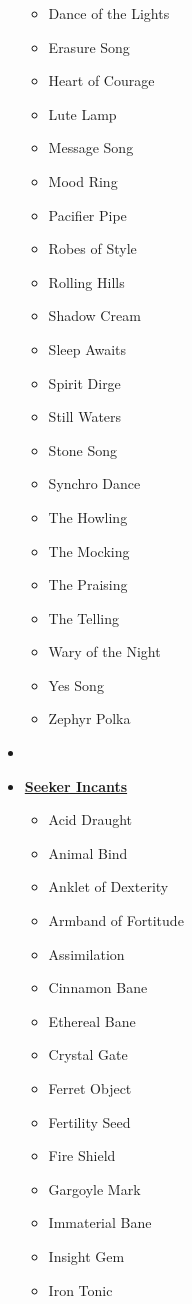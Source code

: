 \begin{multicols*}{4}
\begin{itemize}[leftmargin=0pt]
\begin{itemize}[leftmargin=0pt]
		\item[] Dance of the Lights
		\item[] Erasure Song
		\item[] Heart of Courage
		\item[] Lute Lamp
		\item[] Message Song
		\item[] Mood Ring
		\item[] Pacifier Pipe
		\item[] Robes of Style
		\item[] Rolling Hills
		\item[] Shadow Cream
		\item[] Sleep Awaits
		\item[] Spirit Dirge
		\item[] Still Waters
		\item[] Stone Song
		\item[] Synchro Dance
		\item[] The Howling
		\item[] The Mocking
		\item[] The Praising
		\item[] The Telling
		\item[] Wary of the Night
		\item[] Yes Song
		\item[] Zephyr Polka
	\end{itemize}
	\item[] 
	\item[] \textbf{\ul{Seeker Incants}}
	\begin{itemize}[leftmargin=0pt]
		\item[] Acid Draught
		\item[] Animal Bind
		\item[] Anklet of Dexterity
		\item[] Armband of Fortitude
		\item[] Assimilation
		\item[] Cinnamon Bane
		\item[] Ethereal Bane
		\item[] Crystal Gate
		\item[] Ferret Object
		\item[] Fertility Seed
		\item[] Fire Shield
		\item[] Gargoyle Mark
		\item[] Immaterial Bane
		\item[] Insight Gem
		\item[] Iron Tonic

\end{itemize}
\end{itemize}
\end{multicols*}
